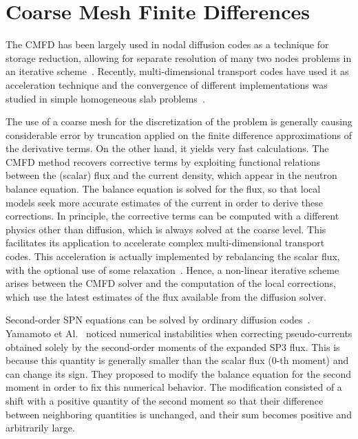 \section{Coarse Mesh Finite Differences}
\label{sec:CMFD-intro}

The CMFD has been largely used in nodal diffusion codes as a technique for storage reduction, allowing for separate resolution of many two nodes problems in an iterative scheme~\cite{Smith-1983,Lawrence-1986}. Recently, multi-dimensional transport codes have used it as acceleration technique and the convergence of different implementations was studied in simple homogeneous slab problems~\cite{Jarrett-2016,Shen-2019}.

The use of a coarse mesh for the discretization of the problem is generally causing considerable error by truncation applied on the finite difference approximations of the derivative terms. On the other hand, it yields very fast calculations. The CMFD method recovers corrective terms by exploiting functional relations between the (scalar) flux and the current density, which appear in the neutron balance equation. The balance equation is solved for the flux, so that local models seek more accurate estimates of the current in order to derive these corrections. In principle, the corrective terms can be computed with a different physics other than diffusion, which is always solved at the coarse level. This facilitates its application to accelerate complex multi-dimensional transport codes. This acceleration is actually implemented by rebalancing the scalar flux, with the optional use of some relaxation~\cite{Park-2017}. Hence, a non-linear iterative scheme arises between the CMFD solver and the computation of the local corrections, which use the latest estimates of the flux available from the diffusion solver.

Second-order SPN equations can be solved by ordinary diffusion codes~\cite{Larsen-1993}. Yamamoto et Al.~\cite{Yamamoto-2016} noticed numerical instabilities when correcting pseudo-currents obtained solely by the second-order moments of the expanded SP3 flux. This is because this quantity is generally smaller than the scalar flux (0-th moment) and can change its sign. They proposed to modify the balance equation for the second moment in order to fix this numerical behavior. The modification consisted of a shift with a positive quantity of the second moment so that their difference between neighboring quantities is unchanged, and their sum becomes positive and arbitrarily large.

